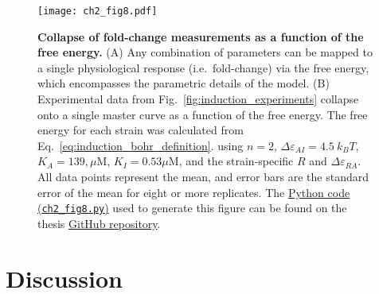 \documentclass[12pt]{caltech_thesis}
\begin{document}
\hypertarget{fig:induction_collapse}{%
\begin{figure}
\centering
\texttt{[image: ch2\_fig8.pdf]}
\caption[{Collapse of fold-change measurements as a function of the free
energy.}]{\textbf{Collapse of fold-change measurements as a function of
the free energy.} (A) Any combination of parameters can be mapped to a
single physiological response (i.e.~fold-change) via the free energy,
which encompasses the parametric details of the model. (B) Experimental
data from Fig.~\ref{fig:induction_experiments} collapse onto a single
master curve as a function of the free energy. The free energy for each
strain was calculated from Eq.~\ref{eq:induction_bohr_definition}. using
\(n=2\), \(\Delta\varepsilon_{AI}=4.5~k_BT\), \(K_A=139, \mu\text{M}\),
\(K_I=0.53 \mu\text{M}\), and the strain-specific \(R\) and
\(\Delta\varepsilon_{RA}\). All data points represent the mean, and
error bars are the standard error of the mean for eight or more
replicates. The
\href{https://github.com/gchure/phd/blob/master/src/chapter_02/code/ch2_fig8.py}{Python
code (\texttt{ch2\_fig8.py})} used to generate this figure can be found
on the thesis \href{https://github.com/gchure/phd}{GitHub repository}.}
\label{fig:induction_collapse}
\end{figure}
}

\hypertarget{discussion}{%
\section{Discussion}\label{discussion}}
\end{document}
